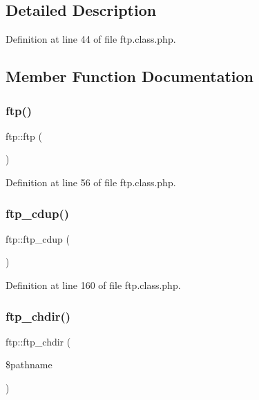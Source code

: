 \subsection{Detailed Description}


Definition at line 44 of file ftp.\+class.\+php.



\subsection{Member Function Documentation}
\mbox{\label{classftp_af893414db9d682963b2d557377cec64b}} 
\subsubsection{\texorpdfstring{ftp()}{ftp()}}
{\footnotesize\ttfamily ftp\+::ftp (\begin{DoxyParamCaption}{ }\end{DoxyParamCaption})}



Definition at line 56 of file ftp.\+class.\+php.

\mbox{\label{classftp_a38fef3185c44245718609e4755d461f7}} 
\subsubsection{\texorpdfstring{ftp\+\_\+cdup()}{ftp\_cdup()}}
{\footnotesize\ttfamily ftp\+::ftp\+\_\+cdup (\begin{DoxyParamCaption}{ }\end{DoxyParamCaption})}



Definition at line 160 of file ftp.\+class.\+php.

\mbox{\label{classftp_ace0f5ec50ca808236dce6a108dc28c63}} 
\subsubsection{\texorpdfstring{ftp\+\_\+chdir()}{ftp\_chdir()}}
{\footnotesize\ttfamily ftp\+::ftp\+\_\+chdir (\begin{DoxyParamCaption}\item[{}]{\$pathname }\end{DoxyParamCaption})}



